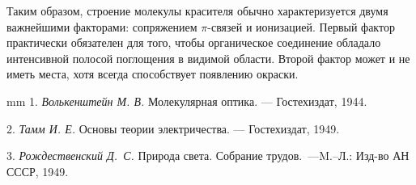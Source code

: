 Таким образом, строение молекулы красителя обычно характеризуется
двумя важнейшими факторами: сопряжением $\pi$-связей и ионизацией.
Первый фактор практически обязателен для того, чтобы органическое
соединение обладало интенсивной полосой поглощения в видимой
области. Второй фактор может и не иметь места, хотя всегда
способствует появлению окраски.

 mm
\vskip 1mm
1. {\itshape Волькенштейн М. В.} Молекулярная оптика. --- Гостехиздат, 1944.

2. {\itshape Тамм И. Е.} Основы теории электричества. --- Гостехиздат, 1949.

3. {\itshape Рождественский Д.~С.} Природа света. Собрание трудов.~---M.--Л.: Изд-во АН СССР, 1949.\thispagestyle{empty}

